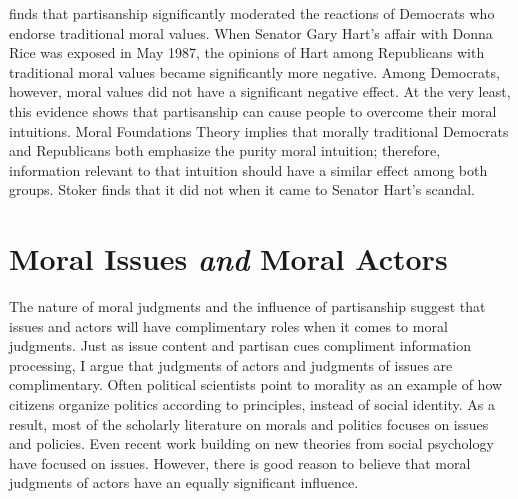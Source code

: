  finds that partisanship significantly moderated the reactions of Democrats who endorse traditional moral values. When Senator Gary Hart's affair with Donna Rice was exposed in May 1987, the opinions of Hart among Republicans with traditional moral values became significantly more negative. Among Democrats, however, moral values did not have a significant negative effect. At the very least, this evidence shows that partisanship can cause people to overcome their moral intuitions. Moral Foundations Theory implies that morally traditional Democrats and Republicans both emphasize the purity moral intuition; therefore, information relevant to that intuition should have a similar effect among both groups. Stoker finds that it did not when it came to Senator Hart's scandal.


\section{Moral Issues \emph{and} Moral Actors}
The nature of moral judgments and the influence of partisanship suggest that issues and actors will have complimentary roles when it comes to moral judgments. Just as issue content and partisan cues compliment information processing, I argue that judgments of actors and judgments of issues are complimentary. Often political scientists point to morality as an example of how citizens organize politics according to principles, instead of social identity. As a result, most of the scholarly literature on morals and politics focuses on issues and policies. Even recent work building on new theories from social psychology have focused on issues. However, there is good reason to believe that moral judgments of actors have an equally significant influence.

